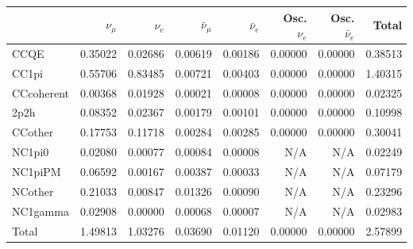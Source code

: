 \begin{tabular} { | l ||r | r | r | r | r | r | | r | }
\hline
              & $\nu_\mu$            & $\nu_e$              & $\bar{\nu}_{\mu}$    & $\bar{\nu}_{e}$      & Osc. $\nu_e$         & Osc. $\bar{\nu}_{e}$ & Total                \\ \hline\hline
 CCQE         & 0.35022              & 0.02686              & 0.00619              & 0.00186              & 0.00000              & 0.00000              & 0.38513              \\ \hline
 CC1pi        & 0.55706              & 0.83485              & 0.00721              & 0.00403              & 0.00000              & 0.00000              & 1.40315              \\ \hline
 CCcoherent   & 0.00368              & 0.01928              & 0.00021              & 0.00008              & 0.00000              & 0.00000              & 0.02325              \\ \hline
 2p2h         & 0.08352              & 0.02367              & 0.00179              & 0.00101              & 0.00000              & 0.00000              & 0.10998              \\ \hline
 CCother      & 0.17753              & 0.11718              & 0.00284              & 0.00285              & 0.00000              & 0.00000              & 0.30041              \\ \hline
 NC1pi0       & 0.02080              & 0.00077              & 0.00084              & 0.00008              & N/A                  & N/A                  & 0.02249              \\ \hline
 NC1piPM      & 0.06592              & 0.00167              & 0.00387              & 0.00033              & N/A                  & N/A                  & 0.07179              \\ \hline
 NCother      & 0.21033              & 0.00847              & 0.01326              & 0.00090              & N/A                  & N/A                  & 0.23296              \\ \hline
 NC1gamma     & 0.02908              & 0.00000              & 0.00068              & 0.00007              & N/A                  & N/A                  & 0.02983              \\ \hline
\hline
 Total        & 1.49813              & 1.03276              & 0.03690              & 0.01120              & 0.00000              & 0.00000              & 2.57899              \\ \hline

\end{tabular}
